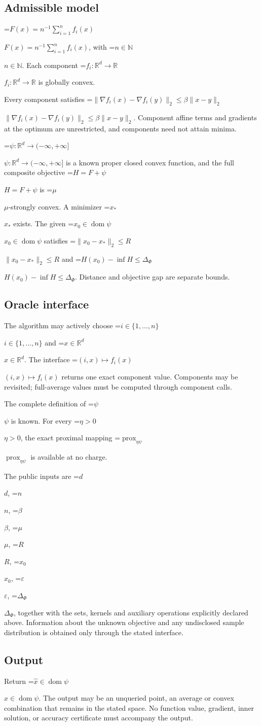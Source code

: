 \documentclass[10pt,a4paper]{article}
\newcommand{\AtlasMath}[1]{\par\begingroup\centering\setbox0=\hbox{$\displaystyle #1$}\ifdim\wd0>1.4\linewidth\typeout{ATLAS WIDE FORMULA: \the\wd0}\fi\ifdim\wd0>\linewidth\resizebox{\linewidth}{!}{\box0}\else\box0\fi\par\endgroup}
\newcommand{\AtlasInlineMath}[1]{\begingroup\setbox0=\hbox{$#1$}\ifdim\wd0>.4\linewidth\endgroup\AtlasMath{#1}\else\endgroup$#1$\fi}
\begin{document}
\subsection{Admissible model}
\AtlasInlineMath{F(x)=n^{-1}\sum_{i=1}^n f_i(x)}, with \AtlasInlineMath{n\in\mathbb{N}}. Each component \AtlasInlineMath{f_i:\mathbb{R}^d\to\mathbb{R}} is globally convex.

Every component satisfies \AtlasInlineMath{\|\nabla f_i(x)-\nabla f_i(y)\|_2\le\beta\|x-y\|_2}. Component affine terms and gradients at the optimum are unrestricted, and components need not attain minima.

\AtlasInlineMath{\psi:\mathbb{R}^d\to(-\infty,+\infty]} is a known proper closed convex function, and the full composite objective \AtlasInlineMath{H=F+\psi} is \AtlasInlineMath{\mu}-strongly convex. A minimizer \AtlasInlineMath{x_*} exists. The given \AtlasInlineMath{x_0\in\operatorname{dom}\psi} satisfies \AtlasInlineMath{\|x_0-x_*\|_2\le R} and \AtlasInlineMath{H(x_0)-\inf H\le\Delta_\Phi}. Distance and objective gap are separate bounds.

\subsection{Oracle interface}
The algorithm may actively choose \AtlasInlineMath{i\in\{1,\ldots,n\}} and \AtlasInlineMath{x\in\mathbb{R}^d}. The interface \AtlasInlineMath{(i,x)\mapsto f_i(x)} returns one exact component value. Components may be revisited; full-average values must be computed through component calls.

The complete definition of \AtlasInlineMath{\psi} is known. For every \AtlasInlineMath{\eta>0}, the exact proximal mapping \AtlasInlineMath{\operatorname{prox}_{\eta\psi}} is available at no charge.

The public inputs are \AtlasInlineMath{d}, \AtlasInlineMath{n}, \AtlasInlineMath{\beta}, \AtlasInlineMath{\mu}, \AtlasInlineMath{R}, \AtlasInlineMath{x_0}, \AtlasInlineMath{\varepsilon}, \AtlasInlineMath{\Delta_\Phi}, together with the sets, kernels and auxiliary operations explicitly declared above. Information about the unknown objective and any undisclosed sample distribution is obtained only through the stated interface.

\subsection{Output}
Return \AtlasInlineMath{\widehat{x}\in \operatorname{dom}\psi}. The output may be an unqueried point, an average or convex combination that remains in the stated space. No function value, gradient, inner solution, or accuracy certificate must accompany the output.
\end{document}
